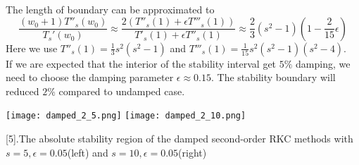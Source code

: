 \documentclass{article}
\theoremstyle{theorem}
\theoremstyle{definition}
\begin{document}
The length of boundary can be approximated to $$\frac{(w_0+1)T''_s(w_0)}{T_s'(w_0)} \approx \frac{2 (T''_s(1)+\epsilon T'''_s(1))}{T'_s(1)+\epsilon T''_s(1)} \approx \frac{2}{3}(s^2-1)(1-\frac{2}{15} \epsilon)$$
Here we use $T''_s(1)=\frac{1}{3}s^2(s^2-1)$ and $T'''_s(1)=\frac{1}{15}s^2(s^2-1)(s^2-4)$.\\
If we are expected that the interior of the stability interval get $5\%$ damping, we need to choose the damping parameter $\epsilon \approx 0.15$. The stability boundary will reduced $2\%$ compared to undamped case.
	
	\texttt{[image: damped\_2\_5.png]}	
	\texttt{[image: damped\_2\_10.png]}
	\begin{center}
		\figurename[5]{.The absolute stability region of the damped second-order RKC methods with $s=5, \epsilon =0.05$(left) and $s=10, \epsilon=0.05$(right)}
	\end{center}
\end{document}
